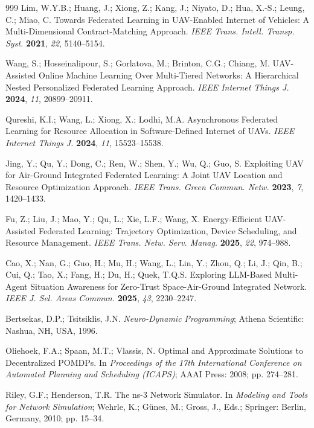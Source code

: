 \documentclass[notspecified,article,submit,moreauthors]{Definitions/mdpi}
\begin{document}
\begin{thebibliography}{999}
Lim, W.Y.B.; Huang, J.; Xiong, Z.; Kang, J.; Niyato, D.; Hua, X.-S.; Leung, C.; Miao, C. Towards Federated Learning in UAV-Enabled Internet of Vehicles: A Multi-Dimensional Contract-Matching Approach. {\em IEEE Trans. Intell. Transp. Syst.} {\bf 2021}, {\em 22}, 5140--5154.

Wang, S.; Hosseinalipour, S.; Gorlatova, M.; Brinton, C.G.; Chiang, M. UAV-Assisted Online Machine Learning Over Multi-Tiered Networks: A Hierarchical Nested Personalized Federated Learning Approach. {\em IEEE Internet Things J.} {\bf 2024}, {\em 11}, 20899--20911.

Qureshi, K.I.; Wang, L.; Xiong, X.; Lodhi, M.A. Asynchronous Federated Learning for Resource Allocation in Software-Defined Internet of UAVs. {\em IEEE Internet Things J.} {\bf 2024}, {\em 11}, 15523--15538.

Jing, Y.; Qu, Y.; Dong, C.; Ren, W.; Shen, Y.; Wu, Q.; Guo, S. Exploiting UAV for Air-Ground Integrated Federated Learning: A Joint UAV Location and Resource Optimization Approach. {\em IEEE Trans. Green Commun. Netw.} {\bf 2023}, {\em 7}, 1420--1433.

Fu, Z.; Liu, J.; Mao, Y.; Qu, L.; Xie, L.F.; Wang, X. Energy-Efficient UAV-Assisted Federated Learning: Trajectory Optimization, Device Scheduling, and Resource Management. {\em IEEE Trans. Netw. Serv. Manag.} {\bf 2025}, {\em 22}, 974--988.

Cao, X.; Nan, G.; Guo, H.; Mu, H.; Wang, L.; Lin, Y.; Zhou, Q.; Li, J.; Qin, B.; Cui, Q.; Tao, X.; Fang, H.; Du, H.; Quek, T.Q.S. Exploring LLM-Based Multi-Agent Situation Awareness for Zero-Trust Space-Air-Ground Integrated Network. {\em IEEE J. Sel. Areas Commun.} {\bf 2025}, {\em 43}, 2230--2247.

Bertsekas, D.P.; Tsitsiklis, J.N. {\em Neuro-Dynamic Programming}; Athena Scientific: Nashua, NH, USA, 1996.

Oliehoek, F.A.; Spaan, M.T.; Vlassis, N. Optimal and Approximate Solutions to Decentralized POMDPs. In {\em Proceedings of the 17th International Conference on Automated Planning and Scheduling (ICAPS)}; AAAI Press: 2008; pp. 274--281.

Riley, G.F.; Henderson, T.R. The ns-3 Network Simulator. In {\em Modeling and Tools for Network Simulation}; Wehrle, K.; G{\"u}nes, M.; Gross, J., Eds.; Springer: Berlin, Germany, 2010; pp. 15--34.


\end{thebibliography}
\end{document}
